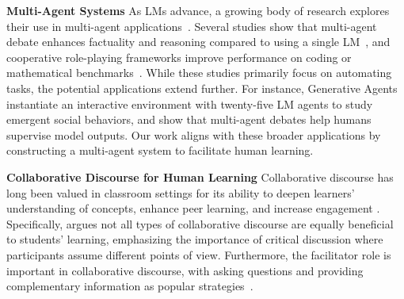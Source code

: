 \noindent
\textbf{Multi-Agent Systems}\quad
As LMs advance, a growing body of research explores their use in multi-agent applications~\citep{wu2023autogen,BabyAGI,liu2023dynamic,wang2024unleashing}. Several studies show that multi-agent debate enhances factuality and reasoning compared to using a single LM~\citep{du2023improving,liang2023encouraging}, and cooperative role-playing frameworks improve performance on coding or mathematical benchmarks~\citep{NEURIPS2023_a3621ee9,hong2023metagpt}. While these studies primarily focus on automating tasks, the potential applications extend further. For instance, Generative Agents~\citep{Park2023GenerativeAgents} instantiate an interactive environment with twenty-five LM agents to study emergent social behaviors, and \citet{michael2023debate} show that multi-agent debates help humans supervise model outputs. Our work aligns with these broader applications by constructing a multi-agent system to facilitate human learning.

\noindent
\textbf{Collaborative Discourse for Human Learning}\quad
Collaborative discourse has long been valued in classroom settings for its ability to deepen learners' understanding of concepts, enhance peer learning, and increase engagement %
\citep{nussbaum2008collaborative,osborne2010arguing,kolodner2007roles,chinn2000structure}. Specifically, \citet{nussbaum2008collaborative} argues not all types of collaborative discourse are equally beneficial to students' learning, emphasizing the importance of critical discussion where participants assume different points of view. Furthermore, the facilitator role is important in collaborative discourse, with asking questions and providing complementary information as popular strategies~\citep{onrubia2022assisting}.
